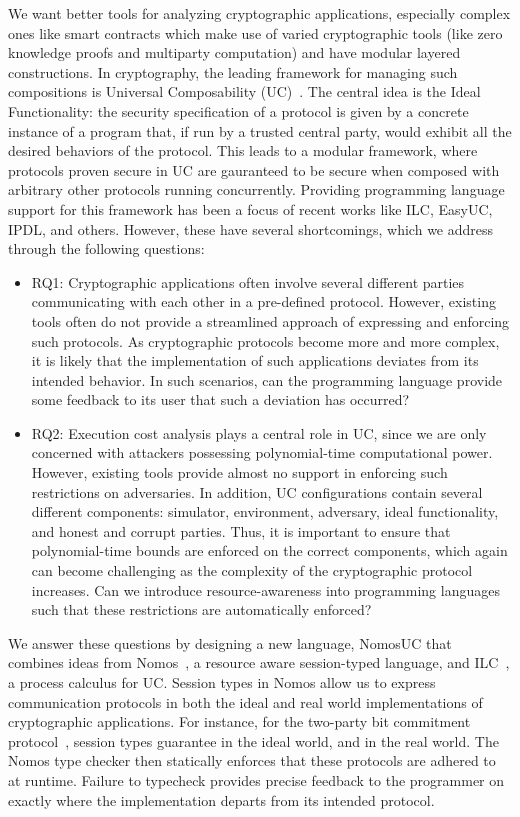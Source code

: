 We want better tools for analyzing cryptographic applications, especially complex ones like smart contracts which make use of varied cryptographic tools (like zero knowledge proofs and multiparty computation) and have modular layered constructions.
In cryptography, the leading framework for managing such compositions is Universal Composability (UC)~\cite{uc}.
The central idea is the Ideal Functionality: the security specification of a protocol is given by a concrete instance of a program that, if run by a trusted central party, would exhibit all the desired behaviors of the protocol.
This leads to a modular framework, where protocols proven secure in UC are gauranteed to be secure when composed with arbitrary other protocols running concurrently.
Providing programming language support for this framework has been a focus of recent works like ILC, EasyUC, IPDL, and others. However, these have several shortcomings, which we address through the following questions:

\begin{itemize}
\item RQ1: Cryptographic applications often involve several different parties communicating
with each other in a pre-defined protocol.
However, existing tools often do not provide a streamlined approach of expressing and enforcing
such protocols.
As cryptographic protocols become more and more complex, it is likely that the implementation
of such applications deviates from its intended behavior.
In such scenarios, can the programming language provide some feedback to its user that such
a deviation has occurred?

\item RQ2: Execution cost analysis plays a central role in UC, since we are only concerned with
attackers possessing polynomial-time computational power.
However, existing tools provide almost no support in enforcing such restrictions on adversaries.
In addition, UC configurations contain several different components: simulator, environment,
adversary, ideal functionality, and honest and corrupt parties.
Thus, it is important to ensure that polynomial-time bounds are enforced on the correct
components, which again can become challenging as the complexity of the cryptographic protocol
increases.
Can we introduce resource-awareness into programming languages such that these restrictions
are automatically enforced?
\end{itemize}

We answer these questions by designing a new language, NomosUC that combines ideas from
Nomos~\cite{dasnomos}, a resource aware session-typed language, and ILC~\cite{ilc},
a process calculus for UC.
Session types in Nomos allow us to express communication protocols in both the ideal and
real world implementations of cryptographic applications.
For instance, for the two-party bit commitment protocol~\cite{rocommitment}, session types guarantee
 in the ideal world, and  in the
real world.
The Nomos type checker then statically enforces that these protocols are adhered to at runtime.
Failure to typecheck provides precise feedback to the programmer on exactly where the
implementation departs from its intended protocol.

